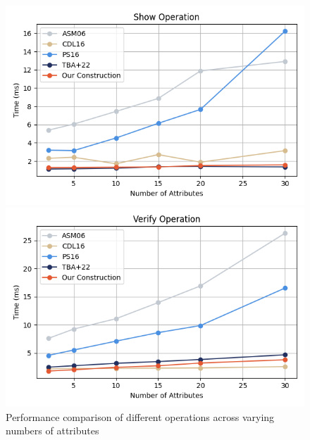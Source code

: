 \begin{figure}
    \begin{minipage}{0.48\textwidth}
        \centering
        \includegraphics[width=\textwidth]{figures/anoncreds_show.png}
    \end{minipage}
    \hfill
    \begin{minipage}{0.48\textwidth}
        \centering
        \includegraphics[width=\textwidth]{figures/anoncreds_verify.png}
    \end{minipage}
    
    \caption{Performance comparison of different operations across varying numbers of attributes}
    \label{fig:anoncreds-performance}
\end{figure}

